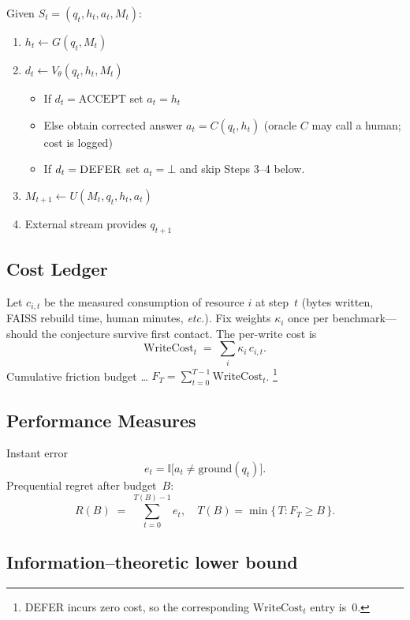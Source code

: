 \documentclass[11pt]{article}
\newcommand{\WriteCost}{\mathrm{WriteCost}}
\begin{document}
Given $S_t=(q_t,h_t,a_t,M_t)$:
\begin{enumerate}
  \item $h_t \leftarrow G(q_t,M_t)$
  \item $d_t \leftarrow V_\theta(q_t,h_t,M_t)$
        \begin{itemize}
          \item If $d_t=\mathrm{ACCEPT}$ set $a_t=h_t$
          \item Else obtain corrected answer $a_t = C(q_t,h_t)$
                (oracle $C$ may call a human; cost is logged)
          \item If $d_t=\textsc{DEFER}$ set $a_t=\bot$
                and skip Steps 3–4 below.
        \end{itemize}
  \item $M_{t+1} \leftarrow U(M_t,q_t,h_t,a_t)$
  \item External stream provides $q_{t+1}$
\end{enumerate}

\subsection{Cost Ledger}
\label{sec:cost-ledger}

Let $c_{i,t}$ be the measured consumption of resource $i$ at step~$t$
(bytes written, FAISS rebuild time, human minutes, \emph{etc.}).
Fix weights $\kappa_i$ once per benchmark—should the conjecture survive first contact.  The per-write cost is
\[
  \WriteCost_t \;=\; \sum_i \kappa_i\,c_{i,t}.
\]
Cumulative friction budget …  $F_T = \sum_{t=0}^{T-1}\WriteCost_t$.%
\footnote{\textsc{DEFER} incurs zero cost, so the corresponding
$\WriteCost_t$ entry is~0.}

\subsection{Performance Measures}
\label{sec:performance-measures}

Instant error
\[
  e_t = \mathbb{I}\bigl[a_t \neq \text{ground}(q_t)\bigr].
\]
Prequential regret after budget~$B$:
\[
  R(B) \;=\; \sum_{t=0}^{T(B)-1} e_t,
  \quad
  T(B) = \min\{\,T : F_T \ge B\,\}.
\]

\subsection{Information–theoretic lower bound}
\label{sec:info-bound}
\end{document}
